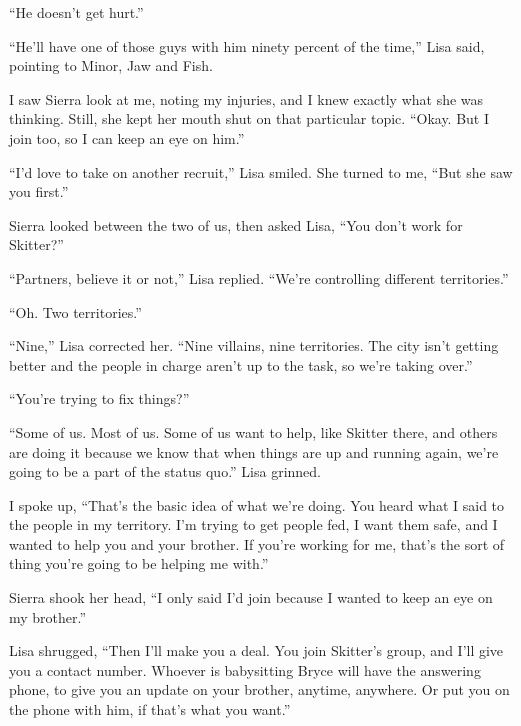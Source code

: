``He doesn't get hurt.''



``He'll have one of those guys with him ninety percent of the time,'' Lisa said, pointing to Minor, Jaw and Fish.



I saw Sierra look at me, noting my injuries, and I knew exactly what she was thinking.  Still, she kept her mouth shut on that particular topic.  ``Okay.  But I join too, so I can keep an eye on him.''



``I'd love to take on another recruit,'' Lisa smiled.  She turned to me, ``But she saw you first.''



Sierra looked between the two of us, then asked Lisa, ``You don't work for Skitter?''



``Partners, believe it or not,'' Lisa replied.  ``We're controlling different territories.''



``Oh.  Two territories.''



``Nine,'' Lisa corrected her.  ``Nine villains, nine territories.  The city isn't getting better and the people in charge aren't up to the task, so we're taking over.''



``You're trying to fix things?''



``Some of us.  Most of us.  Some of us want to help, like Skitter there, and others are doing it because we know that when things are up and running again, we're going to be a part of the status quo.''  Lisa grinned.



I spoke up, ``That's the basic idea of what we're doing.  You heard what I said to the people in my territory.  I'm trying to get people fed, I want them safe, and I wanted to help you and your brother.  If you're working for me, that's the sort of thing you're going to be helping me with.''



Sierra shook her head, ``I only said I'd join because I wanted to keep an eye on my brother.''



Lisa shrugged, ``Then I'll make you a deal.  You join Skitter's group, and I'll give you a contact number.  Whoever is babysitting Bryce will have the answering phone, to give you an update on your brother, anytime, anywhere.  Or put you on the phone with him, if that's what you want.''




